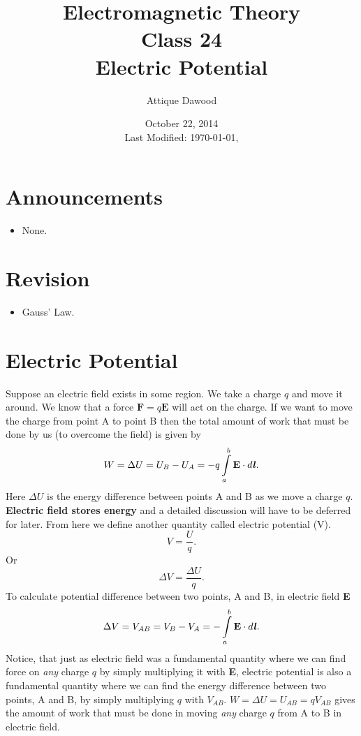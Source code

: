 \documentclass[12pt,a4paper]{article}
\title{Electromagnetic Theory\\Class 24\\Electric Potential}
\author{Attique Dawood}
\date{October 22, 2014\\[0.2cm] Last Modified: \today, \currenttime}
\begin{document}
\maketitle
\section{Announcements}
\begin{itemize}
\item None.
\end{itemize}
\section{Revision}
\begin{itemize}
\item Gauss' Law.
\end{itemize}
\section{Electric Potential}
Suppose an electric field exists in some region. We take a charge $q$ and move it around. We know that a force $\textbf{F}=q\textbf{E}$ will act on the charge. If we want to move the charge from point A to point B then the total amount of work that must be done by us (to overcome the field) is given by
\begin{equation}
W=\Delta U=U_B-U_A=-q\int\limits_{a}^{b} \textbf{E}\cdot d\textbf{\textit{l}}.
\end{equation}
Here $\Delta U$ is the energy difference between points A and B as we move a charge $q$. \textbf{Electric field stores energy} and a detailed discussion will have to be deferred for later. From here we define another quantity called electric potential (V).
\begin{equation}
V=\dfrac{U}{q}.
\end{equation}
Or
\begin{equation}
\Delta V=\dfrac{\Delta U}{q}.
\end{equation}
To calculate potential difference between two points, A and B, in electric field \textbf{E}
\begin{equation}
\Delta V=V_{AB}=V_B-V_A=-\int\limits_{a}^{b} \textbf{E}\cdot d\textbf{\textit{l}}.
\end{equation}
Notice, that just as electric field was a fundamental quantity where we can find force on \textit{any} charge $q$ by simply multiplying it with \textbf{E}, electric potential is also a fundamental quantity where we can find the energy difference between two points, A and B, by simply multiplying $q$ with $V_{AB}$. $W=\Delta U=U_{AB}=qV_{AB}$ gives the amount of work that must be done in moving \textit{any} charge $q$ from A to B in electric field.
\end{document}
